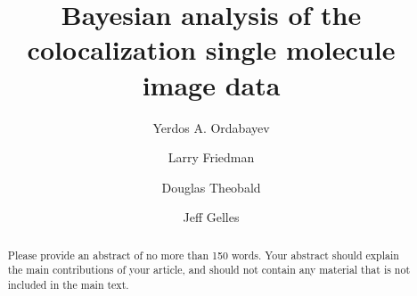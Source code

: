 \documentclass[9pt,lineno]{elife}
\title{Bayesian analysis of the colocalization single molecule image data}
\author[1*]{Yerdos A. Ordabayev}
\author[1,2\authfn{1}\authfn{3}]{Larry Friedman}
\author[2\authfn{1}\authfn{4}]{Douglas Theobald}
\author[2*]{Jeff Gelles}
\affil[1]{Brandeis University}
\affil[2]{Institution 2}
\begin{document}
\maketitle

\begin{abstract}
Please provide an abstract of no more than 150 words. Your abstract should explain the main contributions of your article, and should not contain any material that is not included in the main text.
\end{abstract}




%

%

%

%






\end{document}
